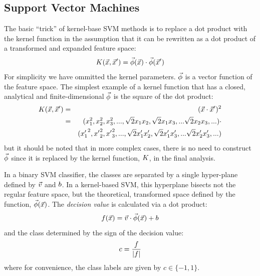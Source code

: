 \documentclass[11pt]{article}
\begin{document}
\subsection{Support Vector Machines}

The basic ``trick'' of kernel-base SVM methods is to replace a dot product
with the kernel function in the assumption that it can be rewritten
as a dot product of a transformed and expanded feature space:
\begin{equation}
	K(\vec {x}, \vec {x}^\prime) = \vec\phi(\vec {x}) \cdot \vec\phi(\vec {x}^\prime)
\end{equation}
For simplicity we have ommitted the kernel parameters.
$\vec\phi$ is a vector function of the feature space.
The simplest example of a kernel function that has a closed, analytical and
finite-dimensional $\vec\phi$ is the square of the dot product:
\begin{eqnarray}
	K(\vec {x}, \vec {x}^\prime) & = & (\vec {x} \cdot \vec {x}^\prime)^2 \\ \nonumber
					 & = & (x_1^2, x_2^2, x_3^2, ..., \sqrt{2} x_1 x_2, \sqrt{2} x_1 x_3, ... \sqrt{2} x_2 x_3, ...) \cdot \\ \nonumber
      & &	 ({x^\prime_1}^2, {x^\prime}_2^2, {x^\prime}_3^2, ..., \sqrt{2} x^\prime_1 x^\prime_2, \sqrt{2} x^\prime_1 x^\prime_3, ... \sqrt{2} x^\prime_2 x^\prime_3, ...) 
\end{eqnarray}
but it should be noted that in more complex cases, 
there is no need to construct $\vec\phi$ since it is replaced by the 
kernel function, $K$, in the final analysis.

In a binary SVM classifier, the classes are separated by a single hyper-plane
defined by $\vec v$ and $b$.
In a kernel-based SVM, this hyperplane bisects not the regular feature
space, but the theoretical, transformed space defined by the function,
$\vec\phi(\vec {x})$.
The {\it decision value} is calculated via a dot product:
\begin{equation}
	f(\vec {x})=\vec v \cdot \vec\phi(\vec {x}) + b
	\label{decision_function0}
\end{equation}
and the class determined by the sign of the decision value:
\begin{equation}
	c=\frac{f}{|f|}
	\label{class_value}
\end{equation}
where for convenience, the class labels are given by $c \in \lbrace -1, 1 \rbrace$.
\end{document}
